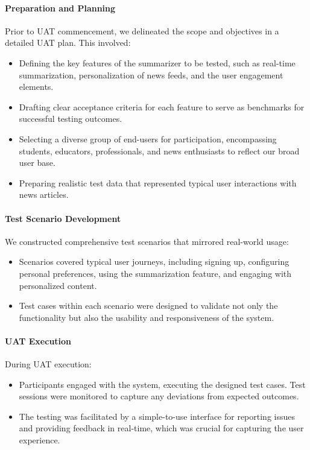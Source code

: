 \documentclass[10pt]{article}
\begin{document}
\paragraph{Preparation and Planning}
Prior to UAT commencement, we delineated the scope and objectives in a detailed UAT plan. This involved:
\begin{itemize}
    \item Defining the key features of the summarizer to be tested, such as real-time summarization, personalization of news feeds, and the user engagement elements.
    \item Drafting clear acceptance criteria for each feature to serve as benchmarks for successful testing outcomes.
    \item Selecting a diverse group of end-users for participation, encompassing students, educators, professionals, and news enthusiasts to reflect our broad user base.
    \item Preparing realistic test data that represented typical user interactions with news articles.
\end{itemize}

\paragraph{Test Scenario Development}
We constructed comprehensive test scenarios that mirrored real-world usage:
\begin{itemize}
    \item Scenarios covered typical user journeys, including signing up, configuring personal preferences, using the summarization feature, and engaging with personalized content.
    \item Test cases within each scenario were designed to validate not only the functionality but also the usability and responsiveness of the system.
\end{itemize}

\paragraph{UAT Execution}
During UAT execution:
\begin{itemize}
    \item Participants engaged with the system, executing the designed test cases. Test sessions were monitored to capture any deviations from expected outcomes.
    \item The testing was facilitated by a simple-to-use interface for reporting issues and providing feedback in real-time, which was crucial for capturing the user experience.
\end{itemize}
\end{document}
